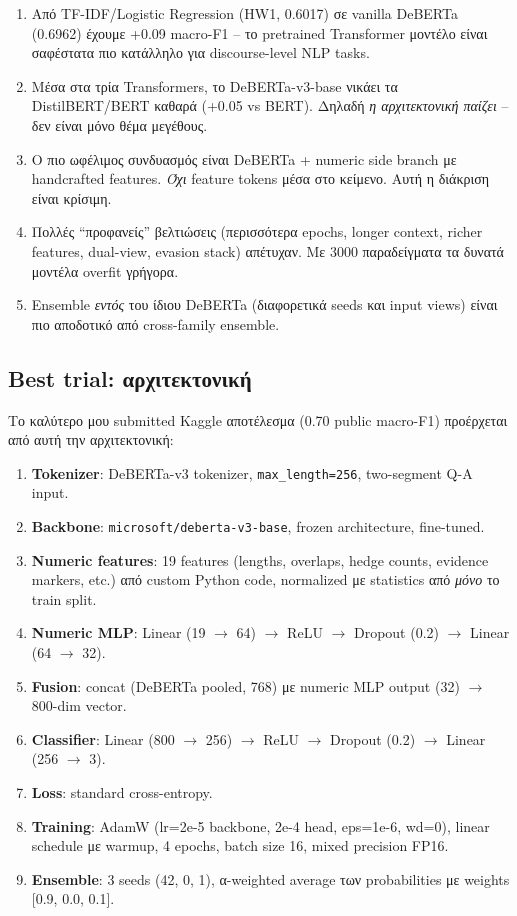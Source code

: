 \documentclass[12pt]{fphw}
\begin{document}
\begin{enumerate}
    \item Από TF-IDF/Logistic Regression (HW1, 0.6017) σε vanilla DeBERTa (0.6962) έχουμε +0.09 macro-F1 -- το pretrained Transformer μοντέλο είναι σαφέστατα πιο κατάλληλο για discourse-level NLP tasks.
    \item Μέσα στα τρία Transformers, το DeBERTa-v3-base νικάει τα DistilBERT/BERT καθαρά (+0.05 vs BERT). Δηλαδή \emph{η αρχιτεκτονική παίζει} -- δεν είναι μόνο θέμα μεγέθους.
    \item Ο πιο ωφέλιμος συνδυασμός είναι DeBERTa + numeric side branch με handcrafted features. \emph{Όχι} feature tokens μέσα στο κείμενο. Αυτή η διάκριση είναι κρίσιμη.
    \item Πολλές ``προφανείς'' βελτιώσεις (περισσότερα epochs, longer context, richer features, dual-view, evasion stack) απέτυχαν. Με 3000 παραδείγματα τα δυνατά μοντέλα overfit γρήγορα.
    \item Ensemble \emph{εντός} του ίδιου DeBERTa (διαφορετικά seeds και input views) είναι πιο αποδοτικό από cross-family ensemble.
\end{enumerate}

\subsection{Best trial: αρχιτεκτονική}

Το καλύτερο μου submitted Kaggle αποτέλεσμα (0.70 public macro-F1) προέρχεται από αυτή την αρχιτεκτονική:

\begin{enumerate}
    \item \textbf{Tokenizer}: DeBERTa-v3 tokenizer, \texttt{max\_length=256}, two-segment Q-A input.
    \item \textbf{Backbone}: \texttt{microsoft/deberta-v3-base}, frozen architecture, fine-tuned.
    \item \textbf{Numeric features}: 19 features (lengths, overlaps, hedge counts, evidence markers, etc.) από custom Python code, normalized με statistics από \emph{μόνο} το train split.
    \item \textbf{Numeric MLP}: Linear (19 $\rightarrow$ 64) $\rightarrow$ ReLU $\rightarrow$ Dropout (0.2) $\rightarrow$ Linear (64 $\rightarrow$ 32).
    \item \textbf{Fusion}: concat (DeBERTa pooled, 768) με numeric MLP output (32) $\rightarrow$ 800-dim vector.
    \item \textbf{Classifier}: Linear (800 $\rightarrow$ 256) $\rightarrow$ ReLU $\rightarrow$ Dropout (0.2) $\rightarrow$ Linear (256 $\rightarrow$ 3).
    \item \textbf{Loss}: standard cross-entropy.
    \item \textbf{Training}: AdamW (lr=2e-5 backbone, 2e-4 head, eps=1e-6, wd=0), linear schedule με warmup, 4 epochs, batch size 16, mixed precision FP16.
    \item \textbf{Ensemble}: 3 seeds (42, 0, 1), α-weighted average των probabilities με weights [0.9, 0.0, 0.1].
\end{enumerate}
\end{document}
